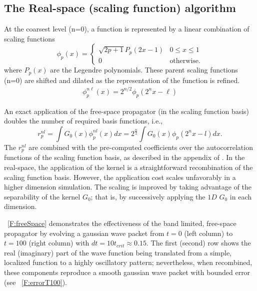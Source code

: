 \documentclass[review,letterpaper]{elsarticle}
\begin{document}
\subsection{The Real-space (scaling function) algorithm}
\label{S:bandLimitedProp}

At the coarsest level (n=0), a function is represented by a linear combination of scaling functions
\begin{equation}
\phi _{p}(x)=\left\{\begin{matrix}\sqrt{2p+1}P_{p}(2x-1)&0\le x\le 1\\0&\textrm{otherwise.}\end{matrix}\right.
\end{equation}
where $P_p(x)$ are the Legendre polynomials.
These parent scaling functions (n=0) are shifted and dilated as the representation of the function is refined.
\begin{align}
\phi^{n \ell}_p(x) = 2^{n/2} \phi_p(2^n x-\ell)
\end{align}

An exact application of the free-space propagator (in the scaling function basis)
doubles the number of required basis functions, i.e.,
\begin{equation}
\label{E:matElem}
r_{p}^{nl}=\int G_{0}(x)\phi _{p}^{nl}(x)dx=2^\frac n2\int G_{0}(x)\phi _{p}(2^{n}x-l)dx.
\end{equation}
The  $r_{p}^{nl}$ are combined with the pre-computed coefficients over the autocorrelation functions of the scaling function basis, as described in the appendix of \cite{mrqc1}.
In the real-space, the application of the kernel is a straightforward recombination
of the scaling function basis.  However, the application cost scales unfavorably
in a higher dimension simulation.  The scaling is improved by taking advantage
of the separability of the kernel $G_0$; that is, by successively applying the $1D$ $G_0$ in each dimension.

\figurename~\ref{F:freeSpace} demonstrates the effectiveness of the band limited, free-space propagator
by evolving a gaussian wave packet from $t = 0$ (left column) to $t = 100$ (right column) with $dt=10t_{crit}\approx0.15$.
The first (second) row shows the real (imaginary) part of the wave function being translated
from a simple, localized function to a highly oscillatory pattern; nevertheless, when recombined,
these components reproduce a smooth gaussian wave packet with bounded error (see \figurename~\ref{F:errorT100}).
\end{document}
